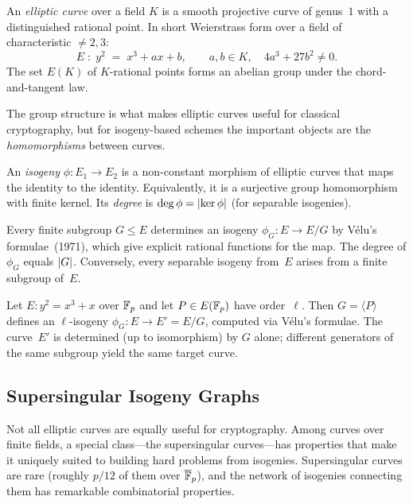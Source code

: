 \begin{definition}
\label{def:elliptic-curve}
An \emph{elliptic curve} over a field $K$ is a smooth projective curve of genus~$1$ with a distinguished rational point.  In short Weierstrass form over a field of characteristic $\neq 2,3$:
\begin{equation}
E \;:\; y^2 \;=\; x^3 + ax + b, \qquad a,b\in K, \quad 4a^3 + 27b^2 \neq 0.
\end{equation}
The set $E(K)$ of $K$-rational points forms an abelian group under the chord-and-tangent law.
\end{definition}

The group structure is what makes elliptic curves useful for classical cryptography, but for isogeny-based schemes the important objects are the \emph{homomorphisms} between curves.

\begin{definition}[Isogeny]
\label{def:isogeny}
An \emph{isogeny} $\phi\colon E_1 \to E_2$ is a non-constant morphism of elliptic curves that maps the identity to the identity.  Equivalently, it is a surjective group homomorphism with finite kernel.  Its \emph{degree} is $\deg\phi = \left\lvert \ker\phi \right\rvert$ (for separable isogenies).
\end{definition}

Every finite subgroup $G \leq E$ determines an isogeny $\phi_G\colon E \to E/G$ by V\'elu's formulae~(1971), which give explicit rational functions for the map.  The degree of $\phi_G$ equals $\left\lvert G \right\rvert$.  Conversely, every separable isogeny from~$E$ arises from a finite subgroup of~$E$.

\begin{example}
\label{ex:isogeny-practice}
Let $E\colon y^2 = x^3 + x$ over $\mathbb{F}_p$ and let $P\in E(\mathbb{F}_p)$ have order~$\ell$.  Then $G = \langle P \rangle$ defines an $\ell$-isogeny $\phi_G\colon E \to E' = E/G$, computed via V\'elu's formulae.  The curve~$E'$ is determined (up to isomorphism) by $G$ alone; different generators of the same subgroup yield the same target curve.
\end{example}


\subsection{Supersingular Isogeny Graphs}
\label{subsec:ss-graphs}

Not all elliptic curves are equally useful for cryptography.  Among curves over finite fields, a special class---the supersingular curves---has properties that make it uniquely suited to building hard problems from isogenies.  Supersingular curves are rare (roughly $p/12$ of them over $\overline{\mathbb{F}}_p$), and the network of isogenies connecting them has remarkable combinatorial properties.


